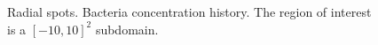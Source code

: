 \begin{figure}
\begin{center}
    \caption[Radial spots. Bacteria concentration history.]{Radial spots. Bacteria concentration history.  The region of interest is a $[-10,10]^2$ subdomain.\label{fig:bio_radial_spots_bacteria}}
  \end{center}
\end{figure}

